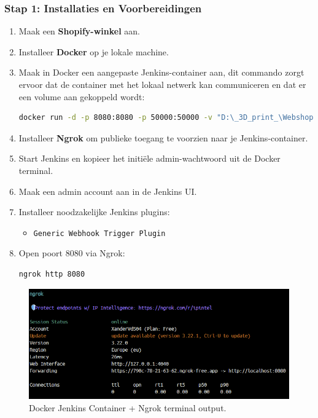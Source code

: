 \subsubsection{Stap 1: Installaties en Voorbereidingen}
\begin{enumerate}
    \item Maak een \textbf{Shopify-winkel} aan.
    \item Installeer \textbf{Docker} op je lokale machine.
    \item Maak in Docker een aangepaste Jenkins-container aan, dit commando zorgt ervoor dat de container met het lokaal netwerk kan communiceren en dat er een volume aan gekoppeld  wordt:
    \begin{lstlisting}[language=bash, caption=Docker commando voor Jenkins met volume en poorten]
        docker run -d -p 8080:8080 -p 50000:50000 -v "D:\_3D_print_\Webshop:/var/jenkins_home" --name jenkins-met-backup jenkins-met-wijzigingen:custom
    \end{lstlisting}
    \item Installeer \textbf{Ngrok} om publieke toegang te voorzien naar je Jenkins-container.
    \item Start Jenkins en kopieer het initiële admin-wachtwoord uit de Docker terminal.
    \item Maak een admin account aan in de Jenkins UI.
    
    \item Installeer noodzakelijke Jenkins plugins:
    \begin{itemize}
        \item \texttt{Generic Webhook Trigger Plugin}
    \end{itemize}
    \item Open poort 8080 via Ngrok:
    \begin{lstlisting}[language=bash]
        ngrok http 8080
    \end{lstlisting}

\end{enumerate}

\vspace{0.5em}
\begin{figure}[H]
    \centering
    \includegraphics[width=1\linewidth]{foto's/ngrokWithJenkins.png}
    \caption{Docker Jenkins Container + Ngrok terminal output.}
    \label{fig:Ngrok-terminal}
\end{figure}

